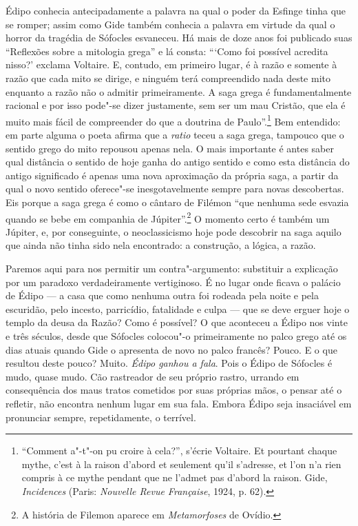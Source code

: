 Édipo conhecia antecipadamente a palavra na qual o poder da Esfinge
tinha que se romper; assim como Gide também conhecia a palavra em
virtude da qual o horror da tragédia de Sófocles esvaneceu. Há mais de
doze anos foi publicado suas ``Reflexões sobre a mitologia grega'' e lá
consta: ```Como foi possível acredita nisso?' exclama Voltaire. E,
contudo, em primeiro lugar, é à razão e somente à razão que cada mito se
dirige, e ninguém terá compreendido nada deste mito enquanto a razão não
o admitir primeiramente. A saga grega é fundamentalmente racional e por
isso pode"-se dizer justamente, sem ser um mau Cristão, que ela é muito
mais fácil de compreender do que a doutrina de Paulo''.\footnote{``Comment
  a"-t"-on pu croire à cela?'', s'écrie Voltaire. Et pourtant chaque
  mythe, c'est à la raison d'abord et seulement qu'il s'adresse, et l'on
  n'a rien compris à ce mythe pendant que ne l'admet pas d'abord la
  raison. Gide, \emph{Incidences} (Paris: \emph{Nouvelle Revue Française},
  1924, p. 62). \versal{[N. T.]}} Bem entendido: em parte alguma o poeta afirma que a
\emph{ratio} teceu a saga grega, tampouco que o sentido grego do mito
repousou apenas nela. O mais importante é antes saber qual distância o
sentido de hoje ganha do antigo sentido e como esta distância do antigo
significado é apenas uma nova aproximação da própria saga, a partir da
qual o novo sentido oferece"-se inesgotavelmente sempre para novas
descobertas. Eis porque a saga grega é como o cântaro de Filémon ``que
nenhuma sede esvazia quando se bebe em companhia de Júpiter''.\footnote{A história de Filemon aparece em \emph{Metamorfoses} de Ovídio. \versal{[N. E.]}} O
momento certo é também um Júpiter, e, por conseguinte, o neoclassicismo
hoje pode descobrir na saga aquilo que ainda não tinha sido nela
encontrado: a construção, a lógica, a razão.

Paremos aqui para nos permitir um contra"-argumento: substituir a
explicação por um paradoxo verdadeiramente vertiginoso. É no lugar onde
ficava o palácio de Édipo --- a casa que como nenhuma outra foi rodeada
pela noite e pela escuridão, pelo incesto, parricídio, fatalidade e
culpa --- que se deve erguer hoje o templo da deusa da Razão? Como é
possível? O que aconteceu a Édipo nos vinte e três séculos, desde que
Sófocles colocou"-o primeiramente no palco grego até os dias atuais
quando Gide o apresenta de novo no palco francês? Pouco. E o que
resultou deste pouco? Muito. \emph{Édipo ganhou a fala}. Pois o Édipo de
Sófocles é mudo, quase mudo. Cão rastreador de seu próprio rastro,
urrando em consequência dos maus tratos cometidos por suas próprias
mãos, o pensar até o refletir, não encontra nenhum lugar em sua fala.
Embora Édipo seja insaciável em pronunciar sempre, repetidamente, o
terrível.

